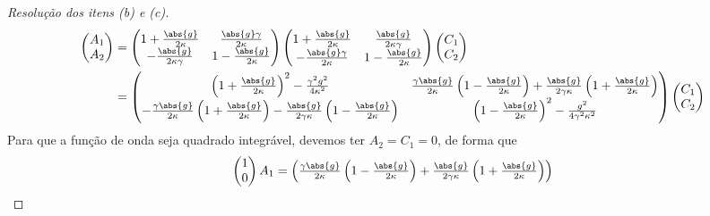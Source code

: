 \begin{proof}[Resolução dos itens (b) e (c)]
    \begin{align*}
        \begin{pmatrix}
            A_1\\
            A_2
        \end{pmatrix}
        &=
        \begin{pmatrix}
            1 + \frac{\abs{g}}{2 \kappa} & \frac{\abs{g} \gamma}{2 \kappa}\\
            - \frac{\abs{g}}{2 \kappa \gamma} & 1 - \frac{\abs{g}}{2 \kappa}
        \end{pmatrix}
        \begin{pmatrix}
            1 + \frac{\abs{g}}{2 \kappa} & \frac{\abs{g}}{2 \kappa \gamma}\\
            -\frac{\abs{g}\gamma}{2 \kappa} & 1 - \frac{\abs{g}}{2 \kappa}
        \end{pmatrix}
        \begin{pmatrix}
            C_1\\
            C_2
        \end{pmatrix}\\
        &=
        \begin{pmatrix}
            \left(1 + \frac{\abs{g}}{2 \kappa}\right)^2 - \frac{\gamma^2 g^2}{4 \kappa^2} & \frac{\gamma \abs{g}}{2 \kappa}\left(1 - \frac{\abs{g}}{2 \kappa}\right) + \frac{\abs{g}}{2 \gamma \kappa}\left(1 + \frac{\abs{g}}{2 \kappa}\right)\\
            -\frac{\gamma \abs{g}}{2 \kappa}\left(1 + \frac{\abs{g}}{2 \kappa}\right) - \frac{\abs{g}}{2 \gamma \kappa}\left(1 - \frac{\abs{g}}{2 \kappa}\right) & \left(1 - \frac{\abs{g}}{2 \kappa}\right)^2 - \frac{g^2}{4 \gamma^2 \kappa^2}
        \end{pmatrix}
        \begin{pmatrix}
            C_1\\
            C_2
        \end{pmatrix}
    \end{align*}
    Para que a função de onda seja quadrado integrável, devemos ter \(A_2 = C_1 = 0\), de forma que
    \begin{equation*}
        \begin{pmatrix}
            1\\
            0
        \end{pmatrix} A_1 =
        \begin{pmatrix}
             \frac{\gamma \abs{g}}{2 \kappa}\left(1 - \frac{\abs{g}}{2 \kappa}\right) + \frac{\abs{g}}{2 \gamma \kappa}\left(1 + \frac{\abs{g}}{2 \kappa}\right)\\

\end{pmatrix}
\end{equation*}
\end{proof}
